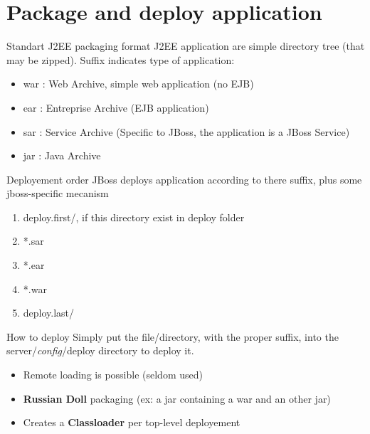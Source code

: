\documentclass[handout]{beamer}
\begin{document}
\section{Package and deploy application}
	\begin{frame}
	 	\begin{block}{Standart J2EE packaging format}
	 	 	J2EE application are simple directory tree (that may be zipped). Suffix indicates type of application:
			\begin{itemize}
				\item war : Web Archive, simple web application (no EJB)
				\item ear : Entreprise Archive (EJB application)
				\item sar : Service Archive (Specific to JBoss, the application is a JBoss Service)
				\item jar : Java Archive
			\end{itemize}
	 	\end{block}
	\end{frame}
	\begin{frame}
	 	\begin{block}{Deployement order}
			JBoss deploys application according to there suffix, plus some jboss-specific mecanism
			\begin{enumerate}
				\item deploy.first/, if this directory exist in deploy folder
				\item *.sar 
				\item *.ear
				\item *.war
				\item deploy.last/
			\end{enumerate}
		\end{block}
	\end{frame}
	\begin{frame}
		\begin{block}{How to deploy}
			Simply put the file/directory, with the proper suffix, into the server/\textit{config}/deploy directory to deploy it.
			\begin{itemize}
				\item Remote loading is possible (seldom used)
				\item \textbf{Russian Doll} packaging (ex: a jar containing a war and an other jar)
				\item Creates a \textbf{Classloader} per top-level deployement
			\end{itemize}
		\end{block}
	\end{frame}
\end{document}
